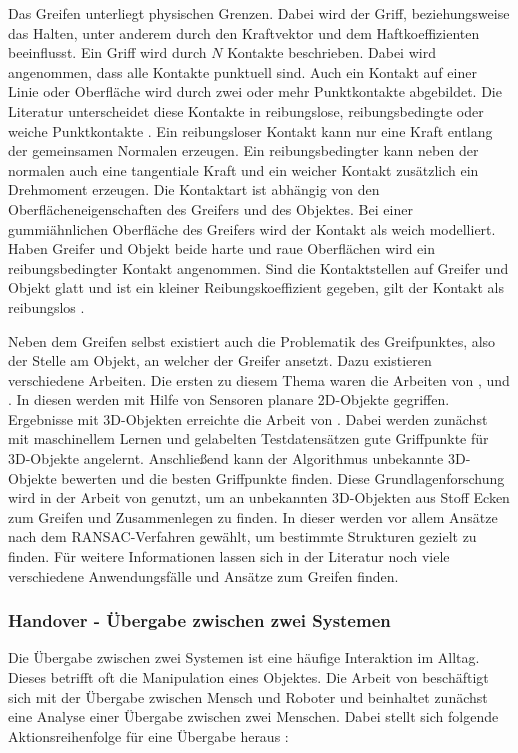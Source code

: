 Das Greifen unterliegt physischen Grenzen. Dabei wird der Griff, beziehungsweise das Halten, unter anderem durch den Kraftvektor und dem Haftkoeffizienten beeinflusst. Ein Griff wird durch $N$ Kontakte beschrieben. Dabei wird angenommen, dass alle Kontakte punktuell sind. Auch ein Kontakt auf einer Linie oder Oberfläche wird durch zwei oder mehr Punktkontakte abgebildet. Die Literatur unterscheidet diese Kontakte in reibungslose, reibungsbedingte oder weiche Punktkontakte \citep{salisbury1983kinematic}. Ein reibungsloser Kontakt kann nur eine Kraft entlang der gemeinsamen Normalen erzeugen. Ein reibungsbedingter kann neben der normalen auch eine tangentiale Kraft und ein weicher Kontakt zusätzlich ein Drehmoment erzeugen. Die Kontaktart ist abhängig von den Oberflächeneigenschaften des Greifers und des Objektes. Bei einer gummiähnlichen Oberfläche des Greifers wird der Kontakt als weich modelliert. Haben Greifer und Objekt beide harte und raue Oberflächen wird ein reibungsbedingter Kontakt angenommen. Sind die Kontaktstellen auf Greifer und Objekt glatt und ist ein kleiner Reibungskoeffizient gegeben, gilt der Kontakt als reibungslos \citep{bicchi2000robotic}.


Neben dem Greifen selbst existiert auch die Problematik des Greifpunktes, also der Stelle am Objekt, an welcher der Greifer ansetzt. Dazu existieren verschiedene Arbeiten. Die ersten zu diesem Thema waren die Arbeiten von \cite{kamon1996learning}, \cite{coelho2001developing} und \cite{bowers2003manipulation}. In diesen werden mit Hilfe von Sensoren planare 2D-Objekte gegriffen. Ergebnisse mit 3D-Objekten erreichte die Arbeit von \cite{saxena2008robotic}. Dabei werden zunächst mit maschinellem Lernen und gelabelten Testdatensätzen gute Griffpunkte für 3D-Objekte angelernt. Anschließend kann der Algorithmus unbekannte 3D-Objekte bewerten und die besten Griffpunkte finden. Diese Grundlagenforschung wird in der Arbeit von \cite{maitin2010cloth} genutzt, um an unbekannten 3D-Objekten aus Stoff Ecken zum Greifen und Zusammenlegen zu finden. In dieser werden vor allem Ansätze nach dem RANSAC-Verfahren gewählt, um bestimmte Strukturen gezielt zu finden. Für weitere Informationen lassen sich in der Literatur noch viele verschiedene Anwendungsfälle und Ansätze zum Greifen finden.

\subsubsection{Handover - Übergabe zwischen zwei Systemen}
Die Übergabe zwischen zwei Systemen ist eine häufige Interaktion im Alltag. Dieses betrifft oft die Manipulation eines Objektes. Die Arbeit von \cite{huber2008human} beschäftigt sich mit der Übergabe zwischen Mensch und Roboter und beinhaltet zunächst eine Analyse einer Übergabe zwischen zwei Menschen. Dabei stellt sich folgende Aktionsreihenfolge für eine Übergabe heraus \citep{huber2008human}:

